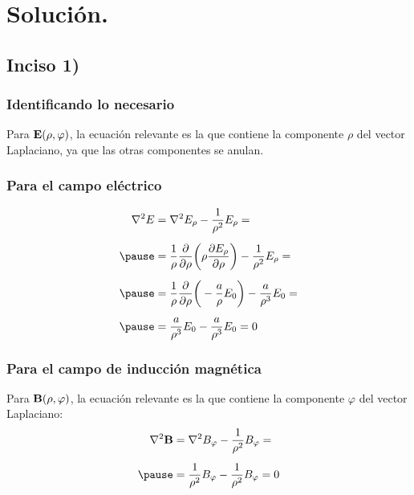 \documentclass[12pt]{beamer}
\begin{document}
\section{Solución.}
\subsection{Inciso 1)}

\begin{frame}
\frametitle{Identificando lo necesario}
Para $\vb{E} (\rho, \varphi)$, la ecuación relevante es la que contiene la componente $\rho$ del vector Laplaciano, ya que las otras componentes se anulan.
\end{frame}
\begin{frame}
\frametitle{Para el campo eléctrico}
\begin{eqnarray*}
\begin{aligned}
\laplacian{E} &= \laplacian{E_{\rho}} - \dfrac{1}{\rho^{2}} E_{\rho} = \\[0.5em] \pause
&= \dfrac{1}{\rho} \pdv{\rho} \bigg( \rho \pdv{E_{\rho}}{\rho} \bigg) - \dfrac{1}{\rho^{2}} E_{\rho} = \\[0.5em] \pause
&= \dfrac{1}{\rho} \pdv{\rho} \bigg( - \dfrac{a}{\rho} E_{0} \bigg) - \dfrac{a}{\rho^{3}} E_{0} = \\[0.5em] \pause
&= \dfrac{a}{\rho^{3}} E_{0} - \dfrac{a}{\rho^{3}} E_{0} = 0
\end{aligned}
\end{eqnarray*}
\end{frame}
\begin{frame}
\frametitle{Para el campo de inducción magnética}
Para $\vb{B} (\rho, \varphi)$, la ecuación relevante es la que contiene la componente $\varphi$ del vector Laplaciano:
\pause
\begin{eqnarray*}
\begin{aligned}
\laplacian{\vb{B}} &= \laplacian{B_{\varphi}} - \dfrac{1}{\rho^{2}} B_{\varphi} = \\[0.5em] \pause
&= \dfrac{1}{\rho^{2}} B_{\varphi} - \dfrac{1}{\rho^{2}} B_{\varphi} = 0
\end{aligned}
\end{eqnarray*}
\end{frame}
\end{document}
